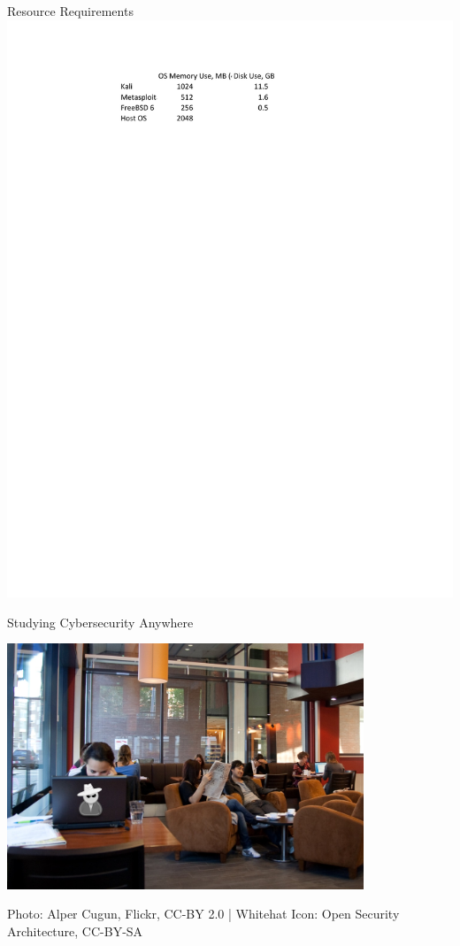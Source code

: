 \documentclass{beamer}
\begin{document}
	\begin{frame}{Resource Requirements}
		\includegraphics[page=2,width=\textwidth, clip=true, trim=0.5in 6in 1in 0.5in]{Resources.pdf}
	\end{frame}
		
	\begin{frame}{Studying Cybersecurity Anywhere}
		\begin{center}
		\includegraphics[width=0.8\textwidth]{coffeeshop_whitehat.jpg}
		
		{\tiny Photo: Alper Cugun, Flickr, CC-BY 2.0 | Whitehat Icon: Open Security Architecture, CC-BY-SA}
		\end{center}
	\end{frame}
	
\end{document}
